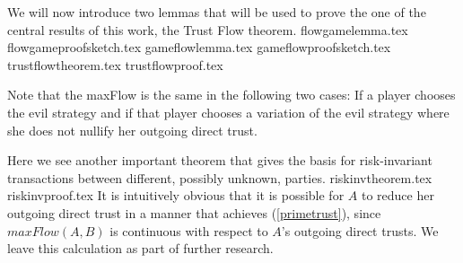   We will now introduce two lemmas that will be used to prove the one of the central results of this work, the Trust Flow
  theorem.
  {flowgamelemma.tex}
  {flowgameproofsketch.tex}
  {gameflowlemma.tex}
  {gameflowproofsketch.tex}
  {trustflowtheorem.tex}
  {trustflowproof.tex}

   Note that the maxFlow is the same in the following two cases: If a player chooses the evil strategy and if that player
   chooses a variation of the evil strategy where she does not nullify her outgoing direct trust.

   Here we see another important theorem that gives the basis for risk-invariant transactions between different, possibly
   unknown, parties.
   {riskinvtheorem.tex}
   {riskinvproof.tex}
   It is intuitively obvious that it is possible for $A$ to reduce her outgoing direct trust in a manner that achieves
   (\ref{primetrust}), since $maxFlow\left(A, B\right)$ is continuous with respect to $A$'s outgoing direct trusts. We
   leave this calculation as part of further research.
